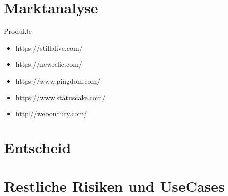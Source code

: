
\section{Marktanalyse}
\label{sec:marktanalyse}

Produkte
\begin{itemize}
  \item https://stillalive.com/
  \item https://newrelic.com/
  \item https://www.pingdom.com/
  \item https://www.statuscake.com/
  \item http://webonduty.com/
\end{itemize}

\section{Entscheid}
\label{sec:entscheid}

\section{Restliche Risiken und UseCases}
\label{sec:restliche_risiken_und_usecases}
